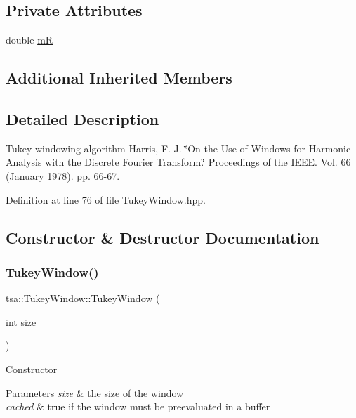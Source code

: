\subsection*{Private Attributes}
\begin{DoxyCompactItemize}
\item 
double \hyperlink{classtsa_1_1_tukey_window_a351edf4bf44bbbda5a7fc6dd629837a2}{mR}
\end{DoxyCompactItemize}
\subsection*{Additional Inherited Members}


\subsection{Detailed Description}
Tukey windowing algorithm Harris, F. J. \char`\"{}\+On the Use of Windows for Harmonic Analysis with the Discrete Fourier Transform.\char`\"{} Proceedings of the I\+E\+EE. Vol. 66 (January 1978). pp. 66-\/67. 

Definition at line 76 of file Tukey\+Window.\+hpp.



\subsection{Constructor \& Destructor Documentation}
\mbox{\label{classtsa_1_1_tukey_window_a89a3f0600e965141831da4dd53e2d9e6}} 
\subsubsection{\texorpdfstring{Tukey\+Window()}{TukeyWindow()}\hspace{0.1cm}{\footnotesize\ttfamily [1/2]}}
{\footnotesize\ttfamily tsa\+::\+Tukey\+Window\+::\+Tukey\+Window (\begin{DoxyParamCaption}\item[{int}]{size }\end{DoxyParamCaption})\hspace{0.3cm}{\ttfamily [inline]}}

Constructor


\begin{DoxyParams}{Parameters}
{\em size} & the size of the window \\
\hline
{\em cached} & true if the window must be preevaluated in a buffer \\
\hline
\end{DoxyParams}


